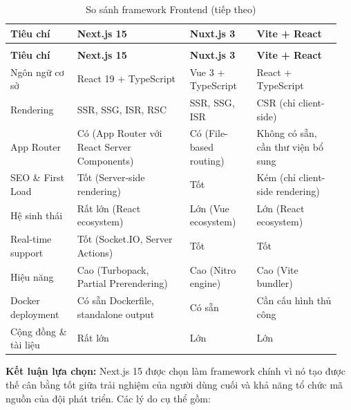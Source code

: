 \documentclass[a4paper]{extarticle}
\newcommand{\thesissettableid}[2]{%
  \renewcommand{\thetable}{#1}%
  \renewcommand{\theHtable}{#2}%
}
\begin{document}
{\thesissettableid{3.24}{tab-ch3-so-sanh-framework-frontend}
\def\LTcaptype{table}
\begin{longtable}{|L{0.195\linewidth}|L{0.323\linewidth}|L{0.192\linewidth}|L{0.244\linewidth}|}
\caption{So sánh framework Frontend}\label{tab:ch3-so-sanh-framework-frontend}\\
\hline \textbf{Tiêu chí} & \textbf{Next.js 15} & \textbf{Nuxt.js 3} & \textbf{Vite + React} \\
\hline
\endfirsthead
\caption[]{So sánh framework Frontend (tiếp theo)}\\
\hline \textbf{Tiêu chí} & \textbf{Next.js 15} & \textbf{Nuxt.js 3} & \textbf{Vite + React} \\
\hline
\endhead
\hline
\endfoot
\endlastfoot
Ngôn ngữ cơ sở & React 19 + TypeScript & Vue 3 + TypeScript & React +
TypeScript \\\hline
Rendering & SSR, SSG, ISR, RSC & SSR, SSG, ISR & CSR (chỉ
client-side) \\\hline
App Router & Có (App Router với React Server Components) & Có
(File-based routing) & Không có sẵn, cần thư viện bổ sung \\\hline
SEO \& First Load & Tốt (Server-side rendering) & Tốt & Kém (chỉ
client-side rendering) \\\hline
Hệ sinh thái & Rất lớn (React ecosystem) & Lớn (Vue ecosystem) & Lớn
(React ecosystem) \\\hline
Real-time support & Tốt (Socket.IO, Server Actions) & Tốt & Tốt \\\hline
Hiệu năng & Cao (Turbopack, Partial Prerendering) & Cao (Nitro engine) &
Cao (Vite bundler) \\\hline
Docker deployment & Có sẵn Dockerfile, standalone output & Có sẵn & Cần
cấu hình thủ công \\\hline
Cộng đồng \& tài liệu & Rất lớn & Lớn & Lớn \\\hline
\end{longtable}
}


\textbf{Kết luận lựa chọn:} Next.js 15 được chọn làm framework chính vì
nó tạo được thế cân bằng tốt giữa trải nghiệm của người dùng cuối và khả
năng tổ chức mã nguồn của đội phát triển. Các lý do cụ thể gồm:
\end{document}

